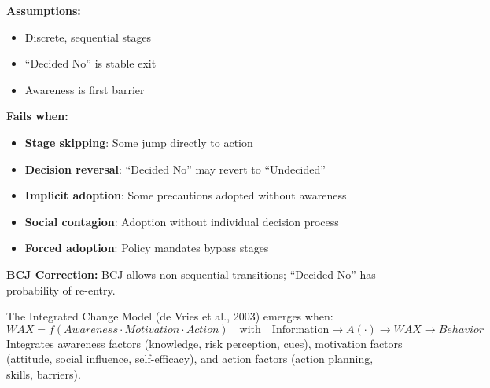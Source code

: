 \begin{tcolorbox}[colback=red!5!white, colframe=red!75!black, title=Boundary Condition: Where PAPM Fails]
\textbf{Assumptions:}
\begin{itemize}[nosep]
\item Discrete, sequential stages
\item ``Decided No'' is stable exit
\item Awareness is first barrier
\end{itemize}

\textbf{Fails when:}
\begin{itemize}[nosep]
\item \textbf{Stage skipping}: Some jump directly to action
\item \textbf{Decision reversal}: ``Decided No'' may revert to ``Undecided''
\item \textbf{Implicit adoption}: Some precautions adopted without awareness
\item \textbf{Social contagion}: Adoption without individual decision process
\item \textbf{Forced adoption}: Policy mandates bypass stages
\end{itemize}

\textbf{BCJ Correction:} BCJ allows non-sequential transitions; ``Decided No'' has probability of re-entry.
\end{tcolorbox}


\begin{theorem}
\label{thm:ichange}
The Integrated Change Model (de Vries et al., 2003) emerges when:
\begin{equation}
\boxed{WAX = f(Awareness \cdot Motivation \cdot Action) \quad \text{with} \quad \text{Information} \to A(\cdot) \to WAX \to Behavior}
\end{equation}
Integrates awareness factors (knowledge, risk perception, cues), motivation factors (attitude, social influence, self-efficacy), and action factors (action planning, skills, barriers).
\end{theorem}

